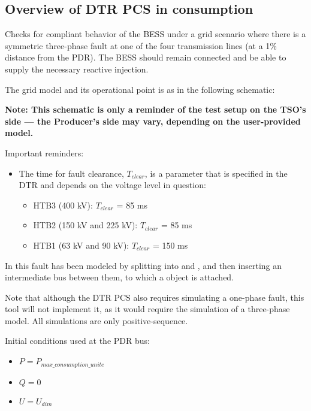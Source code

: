     \subsection{Overview of DTR PCS \DTRPcs in consumption}

    Checks for compliant behavior of the BESS under a grid scenario where there
    is a symmetric three-phase fault at one of the four transmission lines
    (at a 1\% distance from the PDR). The BESS should remain connected and
    be able to supply the necessary reactive injection.

    The grid model and its operational point is as in the following schematic:
    \begin{center}
        
    \end{center}
    \begin{center}
        \small \textbf{Note: This schematic is only a reminder of the test setup on the TSO's
        side --- the Producer's side may vary, depending on the user-provided model.}
    \end{center}

    \noindent Important reminders:
    \begin{itemize}
        \item The time for fault clearance, $T_{clear}$, is a parameter that
        is specified in the DTR and depends on the voltage level in
        question:
        \begin{itemize}
            \item HTB3 (400 kV): $T_{clear}$ = 85 ms
            \item HTB2 (150 kV and 225 kV): $T_{clear}$ = 85 ms
            \item HTB1 (63 kV and 90 kV): $T_{clear}$ = 150 ms
        \end{itemize}
    \end{itemize}

    In \Dynawo{} this fault has been modeled by splitting  into
     and , and then inserting an intermediate bus between
    them, to which a  object is attached.

    Note that although the DTR PCS also requires simulating a one-phase
    fault, this tool will not implement it, as it would require the
    simulation of a three-phase model. All simulations are only
    positive-sequence.

    \begin{description}
        \item Initial conditions used at the PDR bus:
        \begin{itemize}
            \item $P = P_{max\_consumption\_unite}$
            \item $Q = 0$
            \item $U = U_{dim}$
        \end{itemize}
    \end{description}

